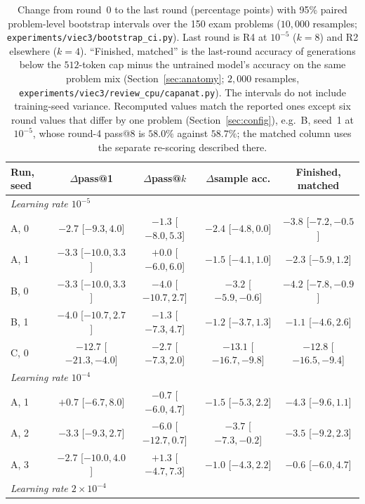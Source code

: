 \documentclass[runningheads]{llncs}
\begin{document}
\begin{table}[!htb]
\caption{Change from round~0 to the last round (percentage points) with 95\%
paired problem-level bootstrap intervals over the 150 exam problems
($10{,}000$ resamples; \texttt{experiments/viec3/bootstrap\_ci.py}). Last round
is R4 at $10^{-5}$ ($k=8$) and R2 elsewhere ($k=4$). ``Finished, matched'' is
the last-round accuracy of generations below the $512$-token cap minus the
untrained model's accuracy on the same problem mix (Section~\ref{sec:anatomy};
$2{,}000$ resamples, \texttt{experiments/viec3/review\_cpu/capanat.py}). The
intervals do not include training-seed variance. Recomputed values match the
reported ones except six round values that differ by one problem
(Section~\ref{sec:config}), e.g.\ B, seed~1 at $10^{-5}$, whose round-4 pass@8
is $58.0\%$ against $58.7\%$; the matched column uses the separate re-scoring
described there.}
\label{tab:ci}
\centering
\scriptsize
\setlength{\tabcolsep}{1.5pt}
\begin{tabular}{lcccc}
\toprule
Run, seed & $\Delta$pass@1 & $\Delta$pass@$k$ & $\Delta$sample acc. & Finished, matched \\
\midrule
\multicolumn{5}{l}{\emph{Learning rate $10^{-5}$}} \\
A, 0 & $-2.7$ [$-9.3,4.0$] & $-1.3$ [$-8.0,5.3$] & $-2.4$ [$-4.8,0.0$] & $-3.8$ [$-7.2,-0.5$] \\
A, 1 & $-3.3$ [$-10.0,3.3$] & $+0.0$ [$-6.0,6.0$] & $-1.5$ [$-4.1,1.0$] & $-2.3$ [$-5.9,1.2$] \\
B, 0 & $-3.3$ [$-10.0,3.3$] & $-4.0$ [$-10.7,2.7$] & $-3.2$ [$-5.9,-0.6$] & $-4.2$ [$-7.8,-0.9$] \\
B, 1 & $-4.0$ [$-10.7,2.7$] & $-1.3$ [$-7.3,4.7$] & $-1.2$ [$-3.7,1.3$] & $-1.1$ [$-4.6,2.6$] \\
C, 0 & $-12.7$ [$-21.3,-4.0$] & $-2.7$ [$-7.3,2.0$] & $-13.1$ [$-16.7,-9.8$] & $-12.8$ [$-16.5,-9.4$] \\
\midrule
\multicolumn{5}{l}{\emph{Learning rate $10^{-4}$}} \\
A, 1 & $+0.7$ [$-6.7,8.0$] & $-0.7$ [$-6.0,4.7$] & $-1.5$ [$-5.3,2.2$] & $-4.3$ [$-9.6,1.1$] \\
A, 2 & $-3.3$ [$-9.3,2.7$] & $-6.0$ [$-12.7,0.7$] & $-3.7$ [$-7.3,-0.2$] & $-3.5$ [$-9.2,2.3$] \\
A, 3 & $-2.7$ [$-10.0,4.0$] & $+1.3$ [$-4.7,7.3$] & $-1.0$ [$-4.3,2.2$] & $-0.6$ [$-6.0,4.7$] \\
\multicolumn{5}{l}{\emph{Learning rate $2\!\times\!10^{-4}$}} \\

\end{tabular}
\end{table}
\end{document}
